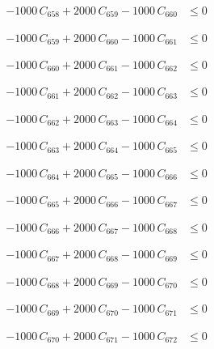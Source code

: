 \documentclass[a4paper,11pt]{article}
\begin{document}
\begin{align}
-1000\,C_{658} + 2000\,C_{659} - 1000\,C_{660} &\leq 0 \nonumber
\end{align}

\begin{align}
-1000\,C_{659} + 2000\,C_{660} - 1000\,C_{661} &\leq 0 \nonumber
\end{align}

\begin{align}
-1000\,C_{660} + 2000\,C_{661} - 1000\,C_{662} &\leq 0 \nonumber
\end{align}

\begin{align}
-1000\,C_{661} + 2000\,C_{662} - 1000\,C_{663} &\leq 0 \nonumber
\end{align}

\begin{align}
-1000\,C_{662} + 2000\,C_{663} - 1000\,C_{664} &\leq 0 \nonumber
\end{align}

\begin{align}
-1000\,C_{663} + 2000\,C_{664} - 1000\,C_{665} &\leq 0 \nonumber
\end{align}

\begin{align}
-1000\,C_{664} + 2000\,C_{665} - 1000\,C_{666} &\leq 0 \nonumber
\end{align}

\begin{align}
-1000\,C_{665} + 2000\,C_{666} - 1000\,C_{667} &\leq 0 \nonumber
\end{align}

\begin{align}
-1000\,C_{666} + 2000\,C_{667} - 1000\,C_{668} &\leq 0 \nonumber
\end{align}

\begin{align}
-1000\,C_{667} + 2000\,C_{668} - 1000\,C_{669} &\leq 0 \nonumber
\end{align}

\begin{align}
-1000\,C_{668} + 2000\,C_{669} - 1000\,C_{670} &\leq 0 \nonumber
\end{align}

\begin{align}
-1000\,C_{669} + 2000\,C_{670} - 1000\,C_{671} &\leq 0 \nonumber
\end{align}

\begin{align}
-1000\,C_{670} + 2000\,C_{671} - 1000\,C_{672} &\leq 0 \nonumber
\end{align}
\end{document}
